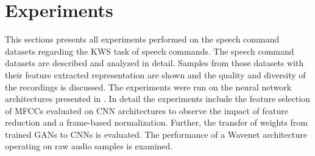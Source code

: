 
\chapter{Experiments}\label{sec:exp}
This sections presents all experiments performed on the speech command datasets regarding the KWS task of speech commands.
The speech command datasets are described and analyzed in detail.
Samples from those datasets with their feature extracted representation are shown and the quality and diversity of the recordings is discussed.
The experiments were run on the neural network architectures presented in .
In detail the experiments include the feature selection of MFCCs evaluated on CNN architectures to observe the impact of feature reduction and a frame-based normalization.
Further, the transfer of weights from trained GANs to CNNs is evaluated.
The performance of a Wavenet architecture operating on raw audio samples is examined.








